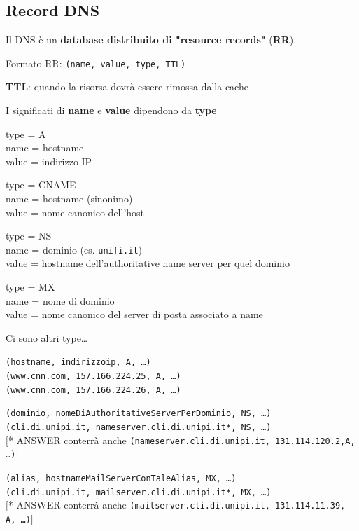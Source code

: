 \documentclass[10pt]{article}
\begin{document}
\subsection{Record DNS}
Il DNS è un \textbf{database distribuito di "resource records"} (\textbf{RR}).
\begin{center}
Formato RR: \texttt{(name, value, type, TTL)}
\end{center}
\begin{list}{}{}
\item \textbf{TTL}: quando la risorsa dovrà essere rimossa dalla cache
\item I significati di \textbf{name} e \textbf{value} dipendono da \textbf{type}
\begin{list}{}{}
\item type = A\\name = hostname\\value = indirizzo IP
\item type = CNAME\\name = hostname (sinonimo)\\value = nome canonico dell'host
\item type = NS\\name = dominio (es. \texttt{unifi.it})\\value = hostname dell'authoritative name server per quel dominio
\item type = MX\\name = nome di dominio\\value = nome canonico del server di posta associato a name
\item Ci sono altri type\ldots
\end{list}
\end{list}
\begin{list}{}{Esempi di record DNS}
\item \texttt{(hostname, indirizzoip, A, \ldots)}\\
\texttt{(www.cnn.com, 157.166.224.25, A, \ldots)}\\
\texttt{(www.cnn.com, 157.166.224.26, A, \ldots)}
\item \texttt{(dominio, nomeDiAuthoritativeServerPerDominio, NS, \ldots)}\\
\texttt{(cli.di.unipi.it, nameserver.cli.di.unipi.it*, NS, \ldots)}\\
$[$* ANSWER conterrà anche \texttt{(nameserver.cli.di.unipi.it, 131.114.120.2,A, \ldots)}$]$
\item \texttt{(alias, hostnameMailServerConTaleAlias, MX, \ldots)}\\
\texttt{(cli.di.unipi.it, mailserver.cli.di.unipi.it*, MX, \ldots)}\\
$[$* ANSWER conterrà anche \texttt{(mailserver.cli.di.unipi.it, 131.114.11.39, A, \ldots)}$]$
\end{list}
\end{document}
